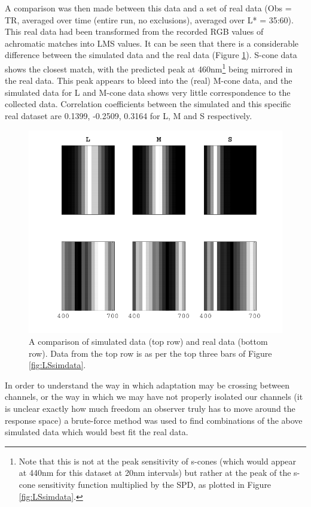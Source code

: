 A comparison was then made between this data and a set of real data (Obs = TR, averaged over time (entire run, no exclusions), averaged over L* = 35:60). This real data had been transformed from the recorded RGB values of achromatic matches into LMS values. It can be seen that there is a considerable difference between the simulated data and the real data (Figure \ref{fig:simVreal}). S-cone data shows the closest match, with the predicted peak at 460nm\footnote{Note that this is not at the peak sensitivity of s-cones (which would appear at 440nm for this dataset at 20nm intervals) but rather at the peak of the s-cone sensitivity function multiplied by the \gls{SPD}, as plotted in Figure \ref{fig:LSsimdata}.} being mirrored in the real data. This peak appears to bleed into the (real) M-cone data, and the simulated data for L and M-cone data shows very little correspondence to the collected data. Correlation coefficients between the simulated and this specific real dataset are 0.1399, -0.2509, 0.3164 for L, M and S respectively.

\begin{figure}[htbp]
\includegraphics[max width=\textwidth]{figs/LargeSphere/simVreal.pdf}
\caption{A comparison of simulated data (top row) and real data (bottom row). Data from the top row is as per the top three bars of Figure \ref{fig:LSsimdata}.}
\label{fig:simVreal}
\end{figure}

In order to understand the way in which adaptation may be crossing between channels, or the way in which we may have not properly isolated our channels (it is unclear exactly how much freedom an observer truly has to move around the response space) a brute-force method was used to find combinations of the above simulated data which would best fit the real data.

